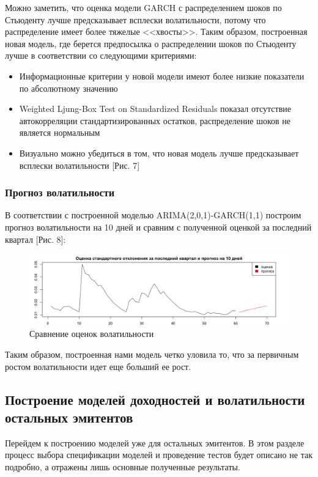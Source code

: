 \documentclass[a4paper,12pt,twoside]{article}
\begin{document}
Можно заметить, что оценка модели GARCH с распределением шоков по Стьюденту лучше предсказывает всплески волатильности, потому что распределение имеет более тяжелые <<хвосты>>.
Таким образом, построенная новая модель, где берется предпосылка о распределении шоков по Стьюденту лучше в соответствии со следующими критериями:
\begin{itemize}
  \item Информационные критерии у новой модели имеют более низкие показатели по абсолютному значению
  \item Weighted Ljung-Box Test on Standardized Residuals показал отсутствие автокорреляции стандартизированных остатков, распределение шоков не является нормальным
  \item Визуально можно убедиться в том, что новая модель лучше предсказывает всплески волатильности [Рис. 7]
\end{itemize}

\subsubsection{Прогноз волатильности}
В соответствии с построенной моделью ARIMA(2,0,1)-GARCH(1,1) построим прогноз волатильности на 10 дней и сравним с полученной оценкой за последний квартал [Рис. 8]:

\begin{figure}[!h]
    \includegraphics[scale = 0.43]{mvideo_9.png}
    \caption{Сравнение оценок волатильности}
    \label{fig:mvideo_09}
\end{figure}

Таким образом, построенная нами модель четко уловила то, что за первичным ростом волатильности идет еще больший ее рост.

\subsection{Построение моделей доходностей и волатильности остальных эмитентов}

Перейдем к построению моделей уже для остальных эмитентов.
В этом разделе процесс выбора спецификации моделей и проведение тестов будет описано не так подробно, а отражены лишь основные полученные результаты.
\end{document}
